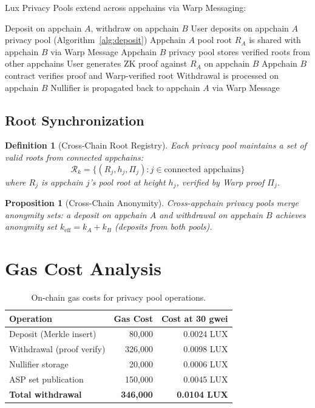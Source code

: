 \documentclass[11pt,a4paper]{article}
\newtheorem{proposition}[theorem]{Proposition}
\newtheorem{definition}{Definition}
\begin{document}
Lux Privacy Pools extend across appchains via Warp Messaging:

\begin{algorithm}[H]
\caption{Cross-Appchain Private Transfer}
\label{alg:cross_private}
\begin{algorithmic}[1]
\Require Deposit on appchain $A$, withdraw on appchain $B$
\State User deposits on appchain $A$ privacy pool (Algorithm~\ref{alg:deposit})
\State Appchain $A$ pool root $R_A$ is shared with appchain $B$ via Warp Message
\State Appchain $B$ privacy pool stores verified roots from other appchains
\State User generates ZK proof against $R_A$ on appchain $B$
\State Appchain $B$ contract verifies proof and Warp-verified root
\State Withdrawal is processed on appchain $B$
\State Nullifier is propagated back to appchain $A$ via Warp Message
\end{algorithmic}
\end{algorithm}

\subsection{Root Synchronization}

\begin{definition}[Cross-Chain Root Registry]
Each privacy pool maintains a set of valid roots from connected appchains:
\begin{equation}
    \mathcal{R}_k = \{(R_j, h_j, \Pi_j) : j \in \text{connected appchains}\}
\end{equation}
where $R_j$ is appchain $j$'s pool root at height $h_j$, verified by Warp proof $\Pi_j$.
\end{definition}

\begin{proposition}[Cross-Chain Anonymity]
Cross-appchain privacy pools merge anonymity sets: a deposit on appchain $A$ and withdrawal on appchain $B$ achieves anonymity set $k_{\text{eff}} = k_A + k_B$ (deposits from both pools).
\end{proposition}

\section{Gas Cost Analysis}\label{sec:gas}

\begin{table}[H]
\centering
\caption{On-chain gas costs for privacy pool operations.}
\label{tab:gas}
\begin{tabular}{lrr}
\toprule
\textbf{Operation} & \textbf{Gas Cost} & \textbf{Cost at 30 gwei} \\
\midrule
Deposit (Merkle insert) & 80,000 & 0.0024 LUX \\
Withdrawal (proof verify) & 326,000 & 0.0098 LUX \\
Nullifier storage & 20,000 & 0.0006 LUX \\
ASP set publication & 150,000 & 0.0045 LUX \\
\midrule
\textbf{Total withdrawal} & \textbf{346,000} & \textbf{0.0104 LUX} \\
\bottomrule
\end{tabular}
\end{table}
\end{document}
